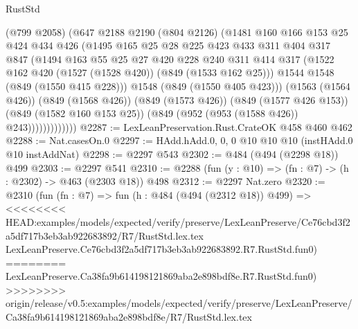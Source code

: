 \begin{lexlean}{RustStd}
\begin{coremodule}
{\begin{coremodule}
{{{{{{{{{                      (@799 @2058)
                      (@647
                        @2188
                        @2190
                        (@804 @2126)
                        (@1481
                          @160
                          @166
                          @153
                          @25
                          @424
                          @434
                          @426
                          (@1495
                            @165
                            @25
                            @28
                            @225
                            @423
                            @433
                            @311
                            @404
                            @317
                            @847
                            (@1494
                              @163
                              @55
                              @25
                              @27
                              @420
                              @228
                              @240
                              @311
                              @414
                              @317
                              (@1522 @162 @420 (@1527 (@1528 @420)) (@849 (@1533 @162 @25)))
                              @1544
                              @1548
                              (@849 (@1550 @415 @228)))
                            @1548
                            (@849 (@1550 @405 @423)))
                          (@1563 (@1564 @426))
                          (@849 (@1568 @426))
                          (@849 (@1573 @426))
                          (@849 (@1577 @426 @153))
                          (@849 (@1582 @160 @153 @25))
                          (@849 (@952 (@953 (@1588 @426)) @243)))))))))))))
@2287 := LexLeanPreservation.Rust.CrateOK @458 @460 @462
@2288 := Nat.casesOn.{0}
@2297 := HAdd.hAdd.{0, 0, 0} @10 @10 @10 (instHAdd.{0} @10 instAddNat)
@2298 := @2297 @543
@2302 := @484 (@494 (@2298 @18)) @499
@2303 := @2297 @541
@2310 := @2288 (fun (y : @10) => (fn : @7) -> (h : @2302) -> @463 (@2303 @18)) @498
@2312 := @2297 Nat.zero
@2320 := @2310
    (fun (fn : @7) =>
    fun (h : @484 (@494 (@2312 @18)) @499) =>
<<<<<<<< HEAD:examples/models/expected/verify/preserve/LexLeanPreserve/Ce76cbd3f2a5df717b3eb3ab922683892/R7/RustStd.lex.tex
    LexLeanPreserve.Ce76cbd3f2a5df717b3eb3ab922683892.R7.RustStd.fun0)
========
    LexLeanPreserve.Ca38fa9b614198121869aba2e898bdf8e.R7.RustStd.fun0)
>>>>>>>> origin/release/v0.5:examples/models/expected/verify/preserve/LexLeanPreserve/Ca38fa9b614198121869aba2e898bdf8e/R7/RustStd.lex.tex
}}}}}}}}}
\end{coremodule}}
\end{coremodule}
\end{lexlean}
